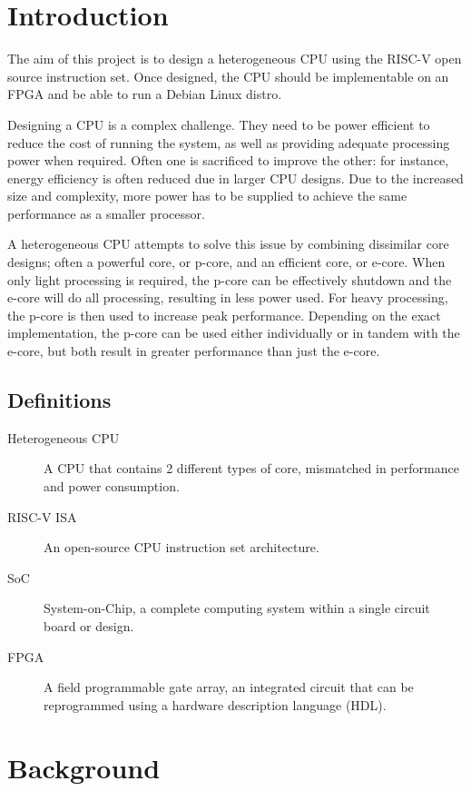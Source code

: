 \documentclass[a4paper,fleqn,11pt]{article}
\begin{document}


\pagestyle{plain}

\section{Introduction}
The aim of this project is to design a heterogeneous CPU using the RISC-V open source instruction set. Once designed, the CPU should be implementable on an FPGA and be able to run a Debian Linux distro.

Designing a CPU is a complex challenge. They need to be power efficient to reduce the cost of running the system, as well as providing adequate processing power when required. Often one is sacrificed to improve the other: for instance, energy efficiency is often reduced due in larger CPU designs. Due to the increased size and complexity, more power has to be supplied to achieve the same performance as a smaller processor.

A heterogeneous CPU attempts to solve this issue by combining dissimilar core designs; often a powerful core, or p-core, and an efficient core, or e-core. When only light processing is required, the p-core can be effectively shutdown and the e-core will do all processing, resulting in less power used. For heavy processing, the p-core is then used to increase peak performance. Depending on the exact implementation, the p-core can be used either individually or in tandem with the e-core, but both result in greater performance than just the e-core.

\subsection{Definitions}
\begin{description}
    \item[Heterogeneous CPU] A CPU that contains 2 different types of core, mismatched in performance and power consumption.
    \item[RISC-V ISA] An open-source CPU instruction set architecture.
    \item[SoC] System-on-Chip, a complete computing system within a single circuit board or design. 
    \item[FPGA] A field programmable gate array, an integrated circuit that can be reprogrammed using a hardware description language (HDL).
\end{description}

\section{Background}
\end{document}
